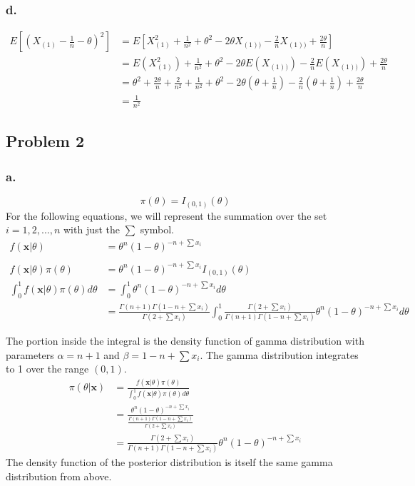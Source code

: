 \documentclass{article}
\begin{document}
\subsubsection*{d.}
\begin{align*}
E\left[(X_{(1)} -\frac{1}{n} - \theta)^2\right] &= E\left[X_{(1)}^2 + \frac{1}{n^2} + \theta^2 - 2\theta X_{(1))} - \frac{2}{n} X_{(1))} + \frac{2\theta}{n}\right] \\
&= E\left(X_{(1)}^2\right) + \frac{1}{n^2} + \theta^2 - 2\theta E(X_{(1))}) - \frac{2}{n} E(X_{(1))}) + \frac{2\theta}{n} \\
&=\theta^2+\frac{2\theta}{n}+\frac{2}{n^2} + \frac{1}{n^2} + \theta^2 - 2\theta\left(\theta + \frac{1}{n}\right) -\frac{2}{n}\left(\theta + \frac{1}{n}\right) + \frac{2\theta}{n} \\
&= \frac{1}{n^2}
\end{align*}


\subsection*{Problem 2}
\subsubsection*{a.}
\[\pi(\theta) = I_{(0,1)}(\theta)\]
For the following equations, we will represent the summation over the set $i = 1, 2, ..., n$ with just the $\sum$ symbol. 
\begin{align*}
f(\mathbf{x}|\theta) &= \theta^n(1-\theta)^{-n+\sum x_i} \\ \\
f(\mathbf{x}|\theta)\pi(\theta) &= \theta^n(1-\theta)^{-n+\sum x_i}I_{(0,1)}(\theta) \\
\int_0^1 f(\mathbf{x}|\theta)\pi(\theta) d\theta &= \int_0^1 \theta^n(1-\theta)^{-n+\sum x_i} d\theta \\
&=\frac{\Gamma(n+1)\Gamma(1-n+\sum x_i)}{\Gamma(2+ \sum x_i)}\int_0^1\frac{\Gamma(2+ \sum x_i)}{\Gamma(n+1)\Gamma(1-n+\sum x_i)}\theta^n(1-\theta)^{-n+\sum x_i} d\theta
\end{align*}
\pagebreak

The portion inside the integral is the density function of gamma distribution with parameters $\alpha = n+1$ and $\beta = 1 - n + \sum x_i$. The gamma distribution integrates to 1 over the range $(0, 1)$. 
\begin{align*}
\pi(\theta|\mathbf{x}) &= \frac{f(\mathbf{x}|\theta)\pi(\theta)}{\int_0^1 f(\mathbf{x}|\theta)\pi(\theta) d\theta} \\
&=\frac{\theta^n(1-\theta)^{-n+\sum x_i}}{\frac{\Gamma(n+1)\Gamma(1-n+\sum x_i)}{\Gamma(2+ \sum x_i)}} \\
&=\frac{\Gamma(2+ \sum x_i)}{\Gamma(n+1)\Gamma(1-n+\sum x_i)}\theta^n(1-\theta)^{-n+\sum x_i}
\end{align*}
The density function of the posterior distribution is itself the same gamma distribution from above. 
\end{document}
